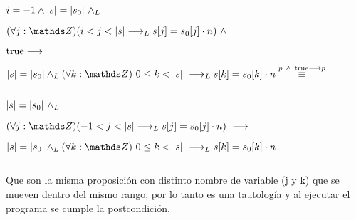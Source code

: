 \documentclass{article}
\begin{document}
\begin{itemize}
        $ i = -1 \wedge |s| = |s_0|\ \land _L$

\quad       $(\forall j: \ent)( i < j < \longitud{s} \implicaLuego s[j] = s_0[j] \cdot n)\ \wedge$

\quad       $ \mathrm{true} \longrightarrow $

\qquad          $\longitud{s} = \longitud{s_0} \yLuego \paraTodo{k}{0}{\longitud{s}} \implicaLuego s[k] = s_0[k] \cdot n \stackrel{p\ \wedge\ \True \implica p}{\equiv} $

        $ $

        $ \longitud{s} = \longitud{s_0}\ \yLuego$

\quad       $(\forall j: \ent)( -1 < j < \longitud{s} \implicaLuego s[j] = s_0[j] \cdot n)\ \implica $

\qquad          $\longitud{s} = \longitud{s_0} \yLuego \paraTodo{k}{0}{\longitud{s}} \implicaLuego s[k] = s_0[k] \cdot n $

        $ $

        Que son la misma proposición con distinto nombre de variable (j y k) que se mueven dentro del mismo rango, por lo tanto es una tautología y al ejecutar el programa se cumple la postcondición. \square

    \end{itemize}
\end{document}
